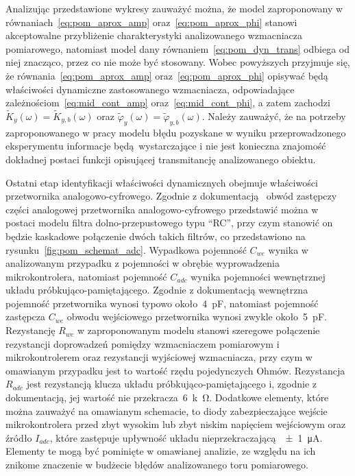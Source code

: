 Analizując przedstawione wykresy zauważyć można, że model zaproponowany w równaniach~\eqref{eq:pom_aprox_amp} oraz~\eqref{eq:pom_aprox_phi} stanowi akceptowalne przybliżenie charakterystyki analizowanego wzmacniacza pomiarowego, natomiast model dany równaniem~\eqref{eq:pom_dyn_trans} odbiega od niej znacząco, przez co nie może być stosowany. Wobec powyższych przyjmuje się, że równania~\eqref{eq:pom_aprox_amp} oraz~\eqref{eq:pom_aprox_phi} opisywać będą właściwości dynamiczne zastosowanego wzmacniacza, odpowiadające zależnościom~\eqref{eq:mid_cont_amp} oraz~\eqref{eq:mid_cont_phi}, a zatem zachodzi $\tilde{K}_{y}(\omega) = \tilde{K}_{y,b}(\omega)$ oraz $\tilde{\varphi}_{y}(\omega) = \tilde{\varphi}_{y,b}(\omega)$. Należy zauważyć, że na potrzeby zaproponowanego w pracy modelu błędu pozyskane w wyniku przeprowadzonego eksperymentu informacje będą wystarczające i nie jest konieczna znajomość dokładnej postaci funkcji opisującej transmitancję analizowanego obiektu.

Ostatni etap identyfikacji właściwości dynamicznych obejmuje właściwości przetwornika analogowo-cyfrowego. Zgodnie z dokumentacją~\cite{stm_f411} obwód zastępczy części analogowej przetwornika analogowo-cyfrowego przedstawić można w postaci modelu filtra dolno-przepustowego typu \enquote{RC}, przy czym stanowić on będzie kaskadowe połączenie dwóch takich filtrów, co przedstawiono na rysunku~\ref{fig:pom_schemat_adc}. Wypadkowa pojemność $C_{we}$ wynika w analizowanym przypadku z pojemności w obrębie wyprowadzenia mikrokontrolera, natomiast pojemność $C_{adc}$ wynika pojemności wewnętrznej układu próbkująco-pamiętającego. Zgodnie z dokumentacją wewnętrzna pojemność przetwornika wynosi typowo około~\qty{4}{pF}, natomiast pojemność zastępcza $C_{we}$ obwodu wejściowego przetwornika wynosi zwykle około~\qty{5}{pF}. Rezystancję $R_{we}$ w zaproponowanym modelu stanowi szeregowe połączenie rezystancji doprowadzeń pomiędzy wzmacniaczem pomiarowym i mikrokontrolerem oraz rezystancji wyjściowej wzmacniacza, przy czym w omawianym przypadku jest to wartość rzędu pojedynczych Ohmów. Rezystancja $R_{adc}$ jest rezystancją klucza układu próbkująco-pamiętającego i, zgodnie z dokumentacją, jej wartość nie przekracza~\qty{6}{k\ohm}. Dodatkowe elementy, które można zauważyć na omawianym schemacie, to diody zabezpieczające wejście mikrokontrolera przed zbyt wysokim lub zbyt niskim napięciem wejściowym oraz źródło $I_{adc}$, które zastępuje upływność układu nieprzekraczającą~\qty{\pm 1}{\micro A}. Elementy te mogą być pominięte w omawianej analizie, ze względu na ich znikome znaczenie w budżecie błędów analizowanego toru pomiarowego.

